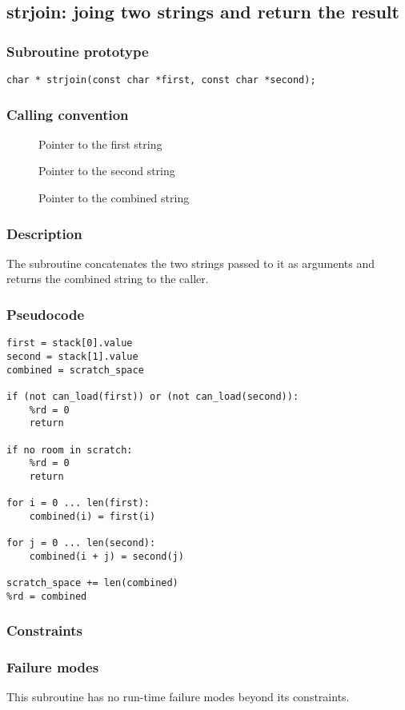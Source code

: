 \clearpage
{}
{}
\label{subr:strjoin}
\subsection*{strjoin: joing two strings and return the result}

\subsubsection*{Subroutine prototype}

\begin{verbatim}
char * strjoin(const char *first, const char *second);
\end{verbatim}

\subsubsection*{Calling convention}

\begin{description}
\item[] Pointer to the first string
\item[] Pointer to the second string
\item[] Pointer to the combined string
\end{description}

\subsubsection*{Description}

The  subroutine concatenates the two strings
passed to it as arguments and returns the combined string to the
caller.

\subsubsection*{Pseudocode}

\begin{verbatim}
first = stack[0].value
second = stack[1].value
combined = scratch_space

if (not can_load(first)) or (not can_load(second)):
    %rd = 0
    return

if no room in scratch:
    %rd = 0
    return

for i = 0 ... len(first):
    combined(i) = first(i)

for j = 0 ... len(second):
    combined(i + j) = second(j)

scratch_space += len(combined)
%rd = combined
\end{verbatim}

\subsubsection*{Constraints}

\subsubsection*{Failure modes}

This subroutine has no run-time failure modes beyond its constraints.
